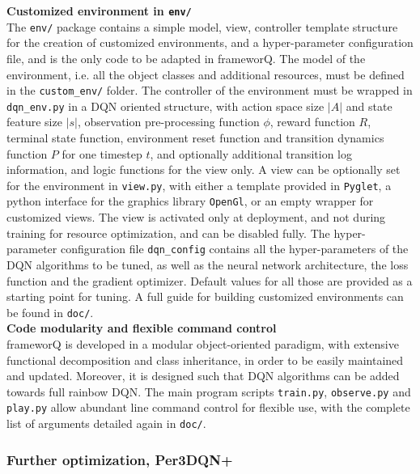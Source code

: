 \textbf{Customized environment in \texttt{env/}} \\
The \texttt{env/} package contains a simple model, view, controller template structure for the creation of customized environments, and a hyper-parameter configuration file, and is the only code to be adapted in frameworQ. The model of the environment, i.e. all the object classes and additional resources, must be defined in the \texttt{custom\_env/} folder. The controller of the environment must be wrapped in \texttt{dqn\_env.py} in a DQN oriented structure, with action space size $|A|$ and state feature size $|s|$, observation pre-processing function $\phi$, reward function $R$, terminal state function, environment reset function and transition dynamics function $P$ for one timestep $t$, and optionally additional transition log information, and logic functions for the view only. A view can be optionally set for the environment in \texttt{view.py}, with either a template provided in \texttt{Pyglet}, a python interface for the graphics library \texttt{OpenGl}, or an empty wrapper for customized views. The view is activated only at deployment, and not during training for resource optimization, and can be disabled fully. The hyper-parameter configuration file \texttt{dqn\_config} contains all the hyper-parameters of the DQN algorithms to be tuned, as well as the neural network architecture, the loss function and the gradient optimizer. Default values for all those are provided as a starting point for tuning. A full guide for building customized environments can be found in \texttt{doc/}. \\

\textbf{Code modularity and flexible command control} \\
frameworQ is developed in a modular object-oriented paradigm, with extensive functional decomposition and class inheritance, in order to be easily maintained and updated. Moreover, it is designed such that DQN algorithms can be added towards full rainbow DQN. The main program scripts \texttt{train.py}, \texttt{observe.py} and \texttt{play.py} allow abundant line command control for flexible use, with the complete list of arguments detailed again in \texttt{doc/}.

\subsubsection{Further optimization, Per3DQN+} \label{basics}

